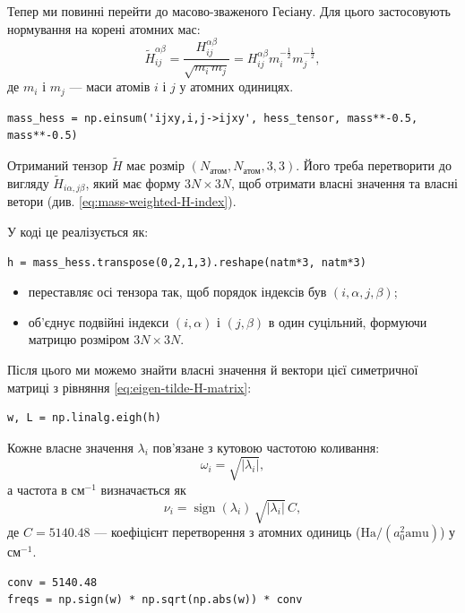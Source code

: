 Тепер ми повинні перейти до масово-зваженого Гесіану. Для цього застосовують нормування на корені атомних мас:
\[
    \tilde{H}_{ij}^{\alpha\beta}
    = \frac{H_{ij}^{\alpha\beta}}{\sqrt{m_i\,m_j}} = H_{ij}^{\alpha\beta} m_i^{-\frac12} m_j^{-\frac12},
\]
де $m_i$ і $m_j$ --- маси атомів $i$ і $j$ у атомних одиницях.

\begin{verbatim}
mass_hess = np.einsum('ijxy,i,j->ijxy', hess_tensor, mass**-0.5, mass**-0.5)
\end{verbatim}

Отриманий тензор \(\tilde{H}\) має розмір \((N_\text{атом}, N_\text{атом}, 3, 3)\). Його треба перетворити до вигляду
$\tilde{H}_{i\alpha, j\beta}$, який має форму \(3N \times 3N\), щоб отримати власні значення та власні ветори (див. \eqref{eq:mass-weighted-H-index}).

У коді це реалізується як:
\begin{verbatim}
h = mass_hess.transpose(0,2,1,3).reshape(natm*3, natm*3)
\end{verbatim}

\begin{itemize}
\item {} переставляє осі тензора так, щоб порядок індексів був   \((i,\alpha,j,\beta)\);
\item {} об’єднує подвійні індекси
\((i,\alpha)\) і \((j,\beta)\) в один суцільний, формуючи матрицю розміром \(3N \times 3N\).
\end{itemize}

Після цього ми можемо знайти власні значення й вектори цієї симетричної матриці з рівняння \eqref{eq:eigen-tilde-H-matrix}:

\begin{verbatim}
w, L = np.linalg.eigh(h)
\end{verbatim}

Кожне власне значення \(\lambda_i\) пов’язане з кутовою частотою коливання:
\[
    \omega_i = \sqrt{|\lambda_i|},
\]
а частота в см\(^{-1}\) визначається як
\[
    \nu_i = \operatorname{sign}(\lambda_i)\, \sqrt{|\lambda_i|}\, C,
\]
де \(C = 5140.48\) --- коефіцієнт перетворення з атомних одиниць
(\(\text{Ha}/(a_0^2 \text{amu})\)) у см\(^{-1}\).

\begin{verbatim}
conv = 5140.48
freqs = np.sign(w) * np.sqrt(np.abs(w)) * conv
\end{verbatim}

